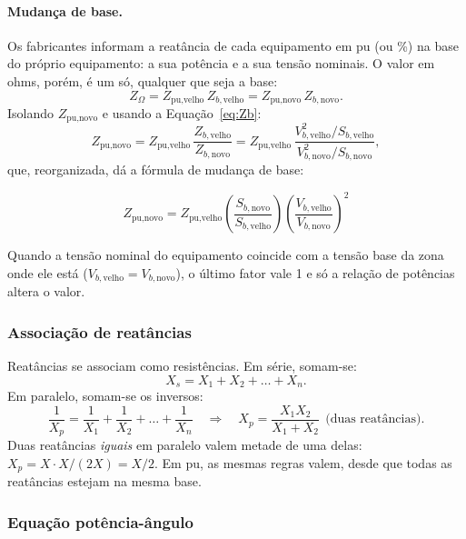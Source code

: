 \documentclass[a4paper,11pt]{article}
\numberwithin{equation}{section}
\numberwithin{figure}{section}
\numberwithin{table}{section}
\begin{document}
\paragraph{Mudança de base.}
Os fabricantes informam a reatância de cada equipamento em pu (ou \%) na
base do próprio equipamento: a sua potência e a sua tensão nominais. O valor
em ohms, porém, é um só, qualquer que seja a base:
\[
  Z_{\Omega} = Z_{\text{pu,velho}}\,Z_{b,\text{velho}}
             = Z_{\text{pu,novo}}\,Z_{b,\text{novo}} .
\]
Isolando $Z_{\text{pu,novo}}$ e usando a Equação~\eqref{eq:Zb}:
\[
  Z_{\text{pu,novo}}
  = Z_{\text{pu,velho}}\,\frac{Z_{b,\text{velho}}}{Z_{b,\text{novo}}}
  = Z_{\text{pu,velho}}\,
    \frac{V_{b,\text{velho}}^{2}/S_{b,\text{velho}}}
         {V_{b,\text{novo}}^{2}/S_{b,\text{novo}}},
\]
que, reorganizada, dá a fórmula de mudança de base:
\begin{conceito}[title=Mudança de base]
  \begin{equation}
    Z_{\text{pu,novo}} = Z_{\text{pu,velho}}
    \left(\frac{S_{b,\text{novo}}}{S_{b,\text{velho}}}\right)
    \left(\frac{V_{b,\text{velho}}}{V_{b,\text{novo}}}\right)^{2}
    \label{eq:mudanca-base}
  \end{equation}
\end{conceito}
Quando a tensão nominal do equipamento coincide com a tensão base da zona
onde ele está ($V_{b,\text{velho}} = V_{b,\text{novo}}$), o último fator
vale 1 e só a relação de potências altera o valor.

\subsubsection{Associação de reatâncias}

Reatâncias se associam como resistências. Em série, somam-se:
\begin{equation}
  X_s = X_1 + X_2 + \dots + X_n .
  \label{eq:serie}
\end{equation}
Em paralelo, somam-se os inversos:
\begin{equation}
  \frac{1}{X_p} = \frac{1}{X_1} + \frac{1}{X_2} + \dots + \frac{1}{X_n}
  \quad\Longrightarrow\quad
  X_p = \frac{X_1 X_2}{X_1 + X_2}\ \ \text{(duas reatâncias)}.
  \label{eq:paralelo}
\end{equation}
Duas reatâncias \emph{iguais} em paralelo valem metade de uma delas:
$X_p = X\cdot X/(2X) = X/2$. Em pu, as mesmas regras valem, desde que todas
as reatâncias estejam na mesma base.

\subsubsection{Equação potência-ângulo}
\end{document}
